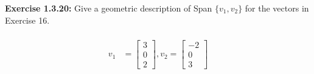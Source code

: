\documentclass{amsart}
\begin{document}
\vspace{1in}





\noindent\textbf{Exercise 1.3.20: }Give a geometric description of Span $\{v_{1},v_{2}\}$ for the vectors in Exercise 16.\\\\
 \begin{align}
v_1&=\begin{bmatrix} 
3\\
0\\
2
\end{bmatrix}
,  v_2=
\begin{bmatrix} 
-2\\
0\\
3
\end{bmatrix}
\end{align}
\end{document}
